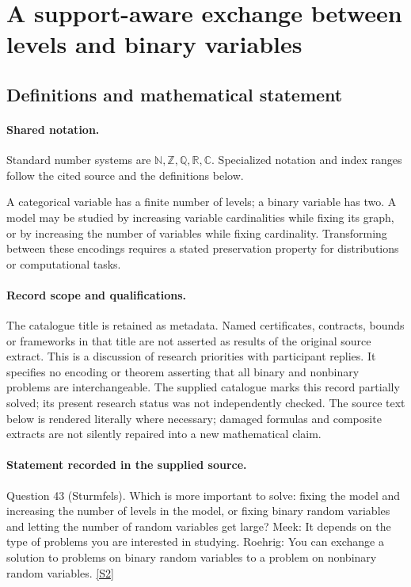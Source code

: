 \documentclass[11pt]{article}
\newcommand{\sref}[2]{\hyperlink{source:#1:#2}{[S#2]}}
\begin{document}
\section{A support-aware exchange between levels and binary variables}\label{statement}

\subsection{Definitions and mathematical statement}

\paragraph{Shared notation.}Standard number systems are $\mathbb N,\mathbb Z,\mathbb Q,\mathbb R,\mathbb C$. Specialized notation and index ranges follow the cited source and the definitions below.


A categorical variable has a finite number of levels; a binary variable has two. A model may be studied by increasing variable cardinalities while fixing its graph, or by increasing the number of variables while fixing cardinality. Transforming between these encodings requires a stated preservation property for distributions or computational tasks.
\paragraph{Record scope and qualifications.}
The catalogue title is retained as metadata. Named certificates, contracts, bounds or frameworks in that title are not asserted as results of the original source extract.
This is a discussion of research priorities with participant replies. It specifies no encoding or theorem asserting that all binary and nonbinary problems are interchangeable. The supplied catalogue marks this record partially solved; its present research status was not independently checked.
The source text below is rendered literally where necessary; damaged formulas and composite extracts are not silently repaired into a new mathematical claim.
\paragraph{Statement recorded in the supplied source.}
Question 43 (Sturmfels). Which is more important to solve: fixing the model and increasing the number of levels in the model, or fixing binary random variables and letting the number of random variables get large? Meek: It depends on the type of problems you are interested in studying. Roehrig: You can exchange a solution to problems on binary random variables to a problem on nonbinary random variables. \sref{statement}{2}
\end{document}
